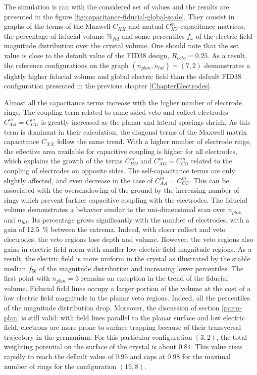 The simulation is ran with the considered set of values and the results are presented in the figure \ref{fig:capacitance-fiducial-global-scale}.  They consist in graphs of the terms of the Maxwell $C_{XX}$ and mutual $C_{XY}^m$ capacitance matrices, the percentage of fiducial volume $\%_{fid}$ and some percentiles $f_x$ of the electric field magnitude distribution over the crystal volume.
One should note that the set value is close to the default value of the FID38 design, $R_{veto}=0.25$. As a result, the reference configurations on the graph $\left( n_{plan}, n_{lat} \right) = (7,2)$ demonstrates a slightly higher fiducial volume and global electric field than the default FID38 configuration presented in the previous chapter \ref{ChapterElectrodes}.

Almost all the capacitance terms increase with the higher number of electrode rings. The coupling term related to same-sided veto and collect electrodes $C_{AB}^m=C_{CD}^m$ is greatly increased as the planar and lateral spacings shrink. As this term is dominant in their calculation, the diagonal terms of the Maxwell matrix capacitance $C_{XX}$ follow the same trend. With a higher number of electrode rings, the effective area available for capacitive coupling is higher for all electrodes, which explains the growth of the terms $C_{BD}^m$ and $C_{AD}^m=C_{CB}^m$ related to the coupling of electrodes on opposite sides. The self-capacitance terms are only slightly affected, and even decrease in the case of $C_{AA}^m=C_{CC}^m$. This can be associated with the overshadowing of the ground by the increasing number of rings which prevent further capacitive coupling with the electrodes.
The fiducial volume demonstrates a behavior similar to the uni-dimensional scan over $n_{plan}$ and $n_{lat}$. Its percentage grows significantly with the number of electrodes, with a gain of \SI{12.5}{\percent} between the extrema. 
Indeed, with closer collect and veto electrodes, the veto regions lose depth and volume. However, the veto regions also gains in electric field norm with smaller low electric field magnitude regions. As a result, the electric field is more uniform in the crystal as illustrated by the stable median $f_{50}$ of the magnitude distribution and increasing lower percentiles.
The first point with $n_{plan} = 3$ remains an exception in the trend of the fiducial volume. Fiducial field lines occupy a larger portion of the volume at the cost of a low electric field magnitude in the planar veto regions. Indeed, all the percentiles of the magnitude distribution drop. Moreover, the discussion of section \ref{par:n-plan} is still valid: with field lines parallel to the planar surface and low electric field, electrons are more prone to surface trapping because of their transversal trajectory in the germanium.
For this particular configuration $(3,2)$, the total weighting potential on the surface of the crystal is about $0.84$. This value rises rapidly to reach the default value of $0.95$ and caps at $0.98$ for the maximal number of rings for the configuration $(19,8)$.

